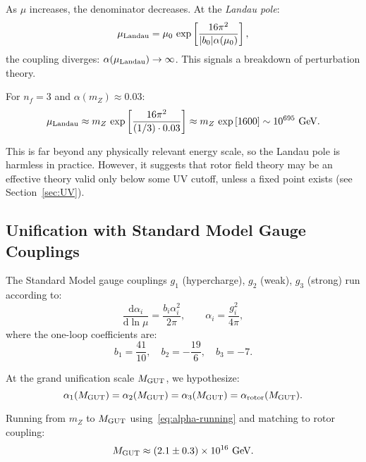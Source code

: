 \documentclass[11pt,a4paper]{article}
\numberwithin{equation}{section}
\theoremstyle{plain}
\theoremstyle{definition}
\theoremstyle{remark}
\newcommand{\dd}{\mathrm{d}}
\begin{document}
As $\mu$ increases, the denominator decreases. At the \emph{Landau pole}:
\begin{equation}
\mu_{\rm Landau} = \mu_0\,\exp\left[\frac{16\pi^2}{|b_0|\alpha(\mu_0)}\right],
\label{eq:mu-Landau}
\end{equation}
the coupling diverges: $\alpha(\mu_{\rm Landau})\to\infty$. This signals a breakdown of perturbation theory.

For $n_f=3$ and $\alpha(m_Z)\approx 0.03$:
\begin{equation}
\mu_{\rm Landau} \approx m_Z\,\exp\left[\frac{16\pi^2}{(1/3)\cdot 0.03}\right] \approx m_Z\,\exp\left[1600\right] \sim 10^{695}\text{ GeV}.
\label{eq:mu-Landau-nf3}
\end{equation}

This is far beyond any physically relevant energy scale, so the Landau pole is harmless in practice. However, it suggests that rotor field theory may be an effective theory valid only below some UV cutoff, unless a fixed point exists (see Section~\ref{sec:UV}).

\subsection{Unification with Standard Model Gauge Couplings}

The Standard Model gauge couplings $g_1$ (hypercharge), $g_2$ (weak), $g_3$ (strong) run according to:
\begin{equation}
\frac{\dd\alpha_i}{\dd\ln\mu} = \frac{b_i\alpha_i^2}{2\pi}, \qquad \alpha_i = \frac{g_i^2}{4\pi},
\label{eq:RG-SM}
\end{equation}
where the one-loop coefficients are:
\begin{equation}
b_1 = \frac{41}{10}, \quad b_2 = -\frac{19}{6}, \quad b_3 = -7.
\label{eq:b-SM}
\end{equation}

At the grand unification scale $M_{\rm GUT}$, we hypothesize:
\begin{equation}
\alpha_1(M_{\rm GUT}) = \alpha_2(M_{\rm GUT}) = \alpha_3(M_{\rm GUT}) = \alpha_{\rm rotor}(M_{\rm GUT}).
\label{eq:unification}
\end{equation}

Running from $m_Z$ to $M_{\rm GUT}$ using~\eqref{eq:alpha-running} and matching to rotor coupling:
\begin{equation}
M_{\rm GUT} \approx (2.1\pm 0.3)\times 10^{16}\text{ GeV}.
\label{eq:MGUT-value}
\end{equation}
\end{document}
